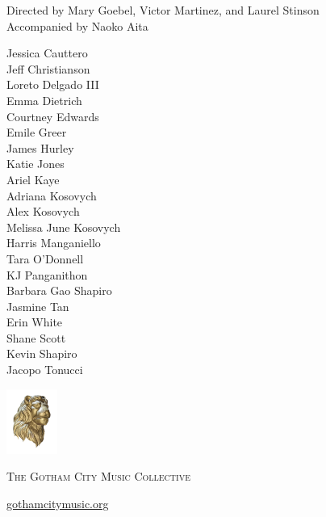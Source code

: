 \documentclass{article}[10pt]
\newcommand{\lion}{
    {\includegraphics[width=0.125\textwidth]{goldie_head.png}}
}
\begin{document}
\begin{titlepage}
\begin{center}
{\begin{small}
Directed by
Mary Goebel,
Victor Martinez,
and
Laurel Stinson\\
Accompanied by Naoko Aita
\end{small}
\vspace{-0.1in}
\begin{multicols*}{3}
\begin{center}
    \begin{small}
        Jessica Cauttero \\ 
        Jeff Christianson \\
        Loreto Delgado III \\        
        Emma Dietrich \\   
        Courtney Edwards \\
        Emile Greer \\        
        James Hurley \\        
        Katie Jones \\        
        Ariel Kaye \\
        Adriana Kosovych \\        
        Alex Kosovych \\        
        {Melissa June Kosovych} \\
        Harris Manganiello \\
        Tara O'Donnell \\
        KJ Panganithon \\
        {Barbara Gao Shapiro} \\
        Jasmine Tan \\
        Erin White \\
        Shane Scott \\        
        Kevin Shapiro \\        
        Jacopo Tonucci
    \end{small}
\end{center}
\end{multicols*}
}


\newpage

{\lion}

    {\scshape \large 
        The Gotham City Music Collective
    \par}


    {\large{
        \href{https://gothamcitymusic.org}{gothamcitymusic.org}
    }}

\vspace{0.1in}
    
\begin{minipage}{4in}
    

\end{minipage}
\end{center}
\end{titlepage}
\end{document}
